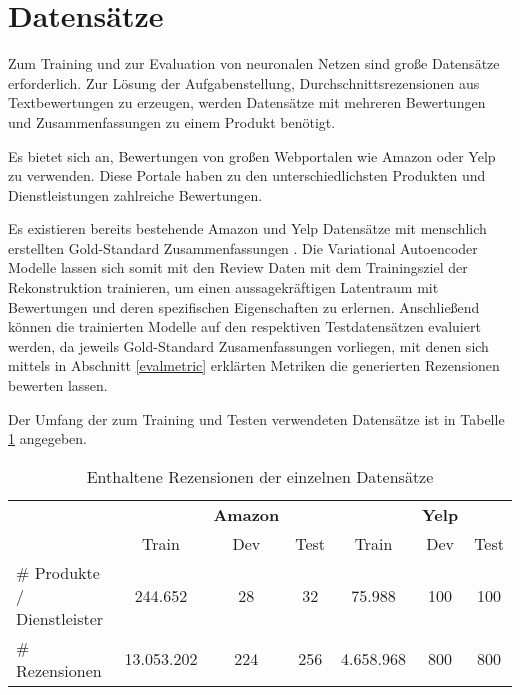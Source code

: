 \section{Datensätze}\raggedbottom
\label{dataset}
Zum Training und zur Evaluation von neuronalen Netzen sind große Datensätze erforderlich. 
Zur Lösung der Aufgabenstellung, Durchschnittsrezensionen aus Textbewertungen zu erzeugen, werden Datensätze mit mehreren Bewertungen und Zusammenfassungen zu einem Produkt benötigt.

Es bietet sich an, Bewertungen von großen Webportalen wie Amazon oder Yelp zu verwenden. 
Diese Portale haben zu den unterschiedlichsten Produkten und Dienstleistungen zahlreiche Bewertungen.

Es existieren bereits bestehende Amazon und Yelp Datensätze mit menschlich erstellten Gold-Standard Zusammenfassungen \citep{copycat}. 
Die Variational Autoencoder Modelle lassen sich somit mit den Review Daten mit dem Trainingsziel der Rekonstruktion trainieren, um einen aussagekräftigen Latentraum mit Bewertungen und deren spezifischen Eigenschaften zu erlernen.
Anschließend können die trainierten Modelle auf den respektiven Testdatensätzen evaluiert werden, da jeweils Gold-Standard Zusamenfassungen vorliegen, mit denen sich mittels in Abschnitt \ref{evalmetric} erklärten Metriken die generierten Rezensionen bewerten lassen.

Der Umfang der zum Training und Testen verwendeten Datensätze ist in Tabelle \ref{dataset_table} angegeben.

\begin{table}[!h]
    \centering
    \begin{tabular}{@{}lccc|ccc@{}}
        \toprule
                              &            & \textbf{Amazon} &      &           & \textbf{Yelp} &      \\
                              & Train      & Dev             & Test & Train     & Dev           & Test \\ \midrule
    \# Produkte / Dienstleister & 244.652    &   28            &  32  & 75.988    &  100          &  100    \\
    \# Rezensionen            & 13.053.202 &    224          &   256& 4.658.968 &  800          &  800 \\ \bottomrule
    \end{tabular}
    \caption{Enthaltene Rezensionen der einzelnen Datensätze \citep{coop}}
    \label{dataset_table}
    \end{table}

